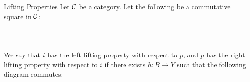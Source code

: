 \documentclass[a4paper]{article}
\begin{document}
\begin{defn}{Lifting Properties}{} Let $\mathcal{C}$ be a category. Let the following be a commutative square in $\mathcal{C}$: \\~\\
\\~\\
We say that $i$ has the left lifting property with respect to $p$, and $p$ has the right lifting property with respect to $i$ if there exists $h:B\to Y$ such that the following diagram commutes: \\~\\
\\~\\
\end{defn}
\end{document}

